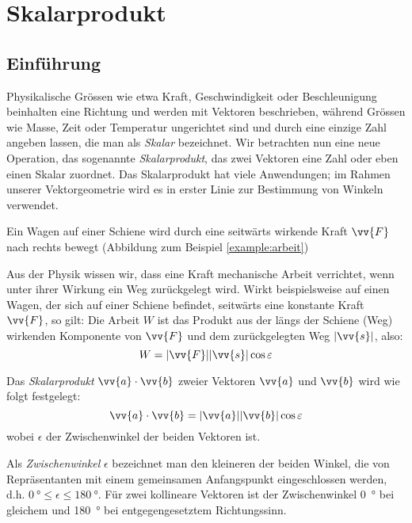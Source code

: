 \chapter{Skalarprodukt}
\section{Einführung}
Physikalische Grössen wie etwa Kraft, Geschwindigkeit oder Beschleunigung beinhalten eine Richtung und werden mit Vektoren beschrieben, während Grössen wie Masse, Zeit oder Temperatur ungerichtet sind und durch eine einzige Zahl angeben lassen, die man als \textit{Skalar} bezeichnet. Wir betrachten nun eine neue Operation, das sogenannte \textit{Skalarprodukt}, das zwei Vektoren eine Zahl oder eben einen Skalar zuordnet. Das Skalarprodukt hat viele Anwendungen; im Rahmen unserer Vektorgeometrie wird es in erster Linie zur Bestimmung von Winkeln verwendet.

\begin{marginfigure}[4cm]
    \caption{Ein Wagen auf einer Schiene wird durch eine seitwärts wirkende Kraft $\vv{F}$ nach rechts bewegt (Abbildung zum Beispiel \ref{example:arbeit})}
\end{marginfigure}
\begin{example}
Aus der Physik wissen wir, dass eine Kraft mechanische Arbeit verrichtet, wenn unter ihrer Wirkung ein Weg zurückgelegt wird. Wirkt beispielsweise auf einen Wagen, der sich auf einer Schiene befindet, seitwärts eine konstante Kraft $\vv{F}$, so gilt:
Die Arbeit $W$ ist das Produkt aus der längs der Schiene (Weg) wirkenden Komponente von $\vv{F}$ und dem zurückgelegten Weg $|\vv{s}|$, also:
\[ W = |\vv{F}||\vv{s}| \cos{\epsilon} \]
\label{example:arbeit}
\end{example}

\begin{definition}
Das \textit{Skalarprodukt} $\vv{a} \cdot \vv{b}$ zweier Vektoren $\vv{a}$ und $\vv{b}$ wird wie folgt festgelegt:
\[ \vv{a} \cdot \vv{b} = |\vv{a}| |\vv{b}| \cos{\epsilon} \]
wobei $\epsilon$ der Zwischenwinkel der beiden Vektoren ist.
\end{definition}
Als \textit{Zwischenwinkel} $\epsilon$ bezeichnet man den kleineren der beiden Winkel, die von Repräsentanten mit einem gemeinsamen Anfangspunkt eingeschlossen werden, d.h. $\SI{0}{\degree} \leq \epsilon \leq \SI{180}{\degree}$. Für zwei kollineare Vektoren ist der Zwischenwinkel \SI{0}{\degree} bei gleichem und \SI{180}{\degree} bei entgegengesetztem Richtungssinn.

